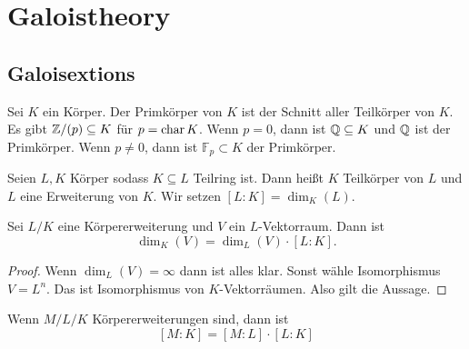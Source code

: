 \section{Galoistheory}
\subsection{Galoisextions}
\begin{Def}
    Sei \(K\) ein Körper. Der Primkörper von \(K\) ist der Schnitt aller Teilkörper von \(K\).
    Es gibt \(\mathbb{Z}/(p)\subseteq K\) für \(p=\operatorname{char} K\).
Wenn \(p=0\), dann ist \(\mathbb{Q}\subseteq K\) und \(\mathbb{Q}\) ist der Primkörper. Wenn \(p\neq 0\), dann ist \(\mathbb F_p\subset K\) der Primkörper.
\end{Def}
\begin{Def}
    Seien \(L,K\) Körper sodass \(K\subseteq L\) Teilring ist. Dann heißt \(K\) Teilkörper von \(L\) und \(L\) eine Erweiterung von \(K\). Wir setzen \([L:K]=\dim_K(L)\).
\end{Def}
\begin{Satz}
    Sei \(L/K\) eine Körpererweiterung und \(V\) ein \(L\)-Vektorraum. Dann ist \[\dim_K(V)=\dim_L(V)\cdot [L:K].\]
\end{Satz}
\begin{proof}
    Wenn \(\dim_L(V)=\infty\) dann ist alles klar. Sonst wähle Isomorphismus \(V=L^n\). Das ist Isomorphismus von \(K\)-Vektorräumen. Also gilt die Aussage.
\end{proof}
\begin{Kor}
    Wenn \(M/L/K\) Körpererweiterungen sind, dann ist 
    \[[M:K]=[M:L]\cdot[L:K]\]
\end{Kor}
